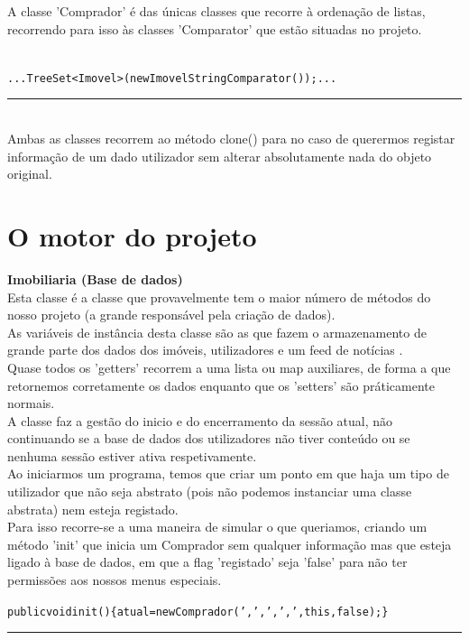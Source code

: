 \documentclass[12pt]{article}
\newenvironment{code}                    
{\textbf{
} \hspace{1cm} \hrulefill \\ 
\smallskip 
\begin{center}
\begin{minipage}{0.9\textwidth} 
\begin{alltt}\small}
{\end{alltt}
\end{minipage}
\end{center}
\hrule\smallskip
}
\begin{document}
A classe 'Comprador' é das únicas classes que recorre à ordenação de listas, recorrendo para isso às classes 'Comparator' que estão situadas no projeto.
~\\
\newline
\begin{code}
... TreeSet <Imovel> (new ImovelStringComparator ()); ...
\end{code}
~\\

Ambas as classes recorrem ao método clone() para no caso de querermos registar informação de um dado utilizador sem alterar absolutamente nada do objeto original.


\pagebreak

\section{O motor do projeto}

\textbf{Imobiliaria (Base de dados)}
\\

Esta classe é a classe que provavelmente tem o maior número de métodos do nosso projeto (a grande responsável pela criação de dados).
\\

As variáveis de instância desta classe são as que fazem o armazenamento de grande parte dos dados dos imóveis, utilizadores e um feed de notícias . 
\\

Quase todos os 'getters' recorrem a uma lista ou map auxiliares, de forma a que retornemos corretamente os dados enquanto que os 'setters' são práticamente normais.
\\

A classe faz a gestão do inicio e do encerramento da sessão atual, não continuando se a base de dados dos utilizadores não tiver conteúdo ou se nenhuma sessão estiver ativa respetivamente.
\\

Ao iniciarmos um programa, temos que criar um ponto em que haja um tipo de utilizador que não seja abstrato (pois não podemos instanciar uma classe abstrata) nem esteja registado.\\

Para isso recorre-se a uma maneira de simular o que queriamos, criando um método 'init' que inicia um Comprador sem qualquer informação mas que esteja ligado à base de dados, em que a flag 'registado' seja 'false' para não ter permissões aos nossos menus especiais.
\newline
\begin{code}
   public void init()\{atual = new Comprador (',',',',',this,false);\}
\end{code}
~\\
\end{document}

